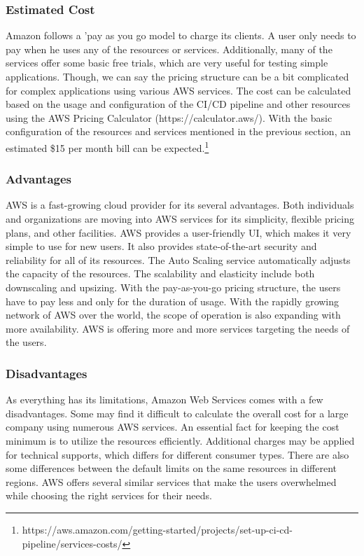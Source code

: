 %

\subsubsection{Estimated Cost}
%
Amazon follows a 'pay as you go model to charge its clients. A user only needs to pay when he uses any of the resources or services. Additionally, many of the services offer some basic free trials, which are very useful for testing simple applications. Though, we can say the pricing structure can be a bit complicated for complex applications using various AWS services.\cite{AWS_Cost} The cost can be calculated based on the usage and configuration of the CI/CD pipeline and other resources using the AWS Pricing Calculator (https://calculator.aws/). With the basic configuration of the resources and services mentioned in the previous section, an estimated \$15 per month bill can be expected.\footnote{https://aws.amazon.com/getting-started/projects/set-up-ci-cd-pipeline/services-costs/}
%

\subsubsection{Advantages}
%
AWS is a fast-growing cloud provider for its several advantages. Both individuals and organizations are moving into AWS services for its simplicity, flexible pricing plans, and other facilities. AWS provides a user-friendly UI, which makes it very simple to use for new users. It also provides state-of-the-art security and reliability for all of its resources. The Auto Scaling service automatically adjusts the capacity of the resources. The scalability and elasticity include both downscaling and upsizing. With the pay-as-you-go pricing structure, the users have to pay less and only for the duration of usage. With the rapidly growing network of AWS over the world, the scope of operation is also expanding with more availability. AWS is offering more and more services targeting the needs of the users.



%


\subsubsection{Disadvantages}
As everything has its limitations, Amazon Web Services comes with a few disadvantages. Some may find it difficult to calculate the overall cost for a large company using numerous AWS services. An essential fact for keeping the cost minimum is to utilize the resources efficiently. Additional charges may be applied for technical supports, which differs for different consumer types. There are also some differences between the default limits on the same resources in different regions. AWS offers several similar services that make the users overwhelmed while choosing the right services for their needs.






